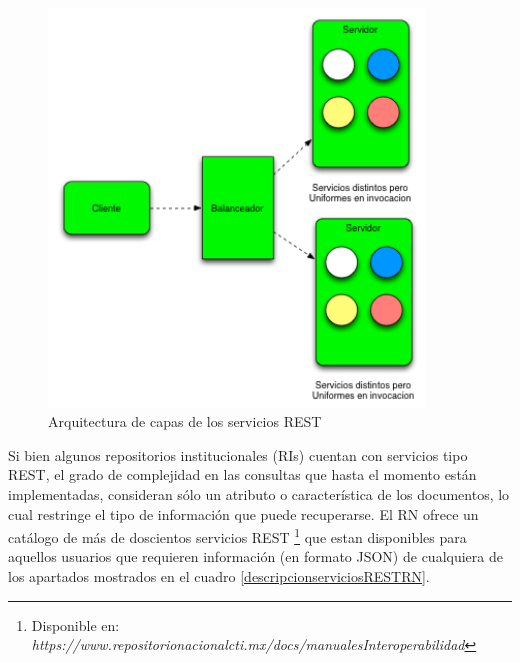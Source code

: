 \begin{itemize}
    \begin{figure}[!ht]
        \centering
        \includegraphics[width=10cm]{figures/ClienteServidorREST5.png} %
        \caption{Arquitectura de capas de los servicios REST} %
        \label{arquitecturaREST5}
    \end{figure}
    
\end{itemize}

Si bien algunos repositorios institucionales (RIs) cuentan con servicios tipo REST, el grado de complejidad en las consultas que hasta el momento est\'an implementadas, consideran s\'olo un atributo o caracter\'istica de los documentos, lo cual restringe el tipo de informaci\'on que puede recuperarse. El RN ofrece un cat\'alogo de m\'as de doscientos servicios REST \footnote{Disponible en: \textit{https://www.repositorionacionalcti.mx/docs/manualesInteroperabilidad}} que estan disponibles para aquellos usuarios que requieren informaci\'on (en formato JSON) \cite{CatalogoRESTRN} de cualquiera de los apartados mostrados en el cuadro \ref{descripcionserviciosRESTRN}.

